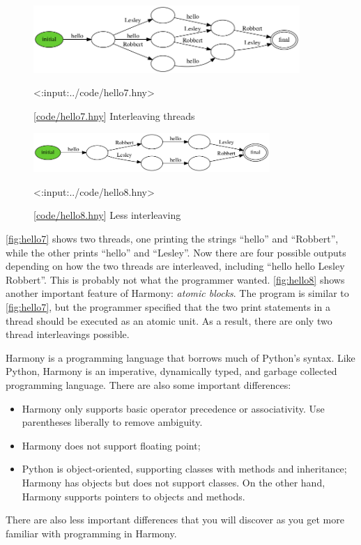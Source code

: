 \documentclass{report}
\newcommand{\harmonylink}[1]{%
[\href{https://harmony.cs.cornell.edu/#1}{\underline{#1}}]%
}
\newenvironment{code}{
\tcolorbox
}{
\endtcolorbox
}
\begin{document}
\begin{figure}
\begin{center}
\includegraphics[width=0.9\textwidth]{figures/hello7.png}
\end{center}
\begin{code}
<{:input:../code/hello7.hny}>
\end{code}
\caption{\harmonylink{code/hello7.hny} Interleaving threads}
\label{fig:hello7}
\end{figure}

\begin{figure}
\begin{center}
\includegraphics[width=0.8\textwidth]{figures/hello8.png}
\end{center}
\begin{code}
<{:input:../code/hello8.hny}>
\end{code}
\caption{\harmonylink{code/hello8.hny} Less interleaving}
\label{fig:hello8}
\end{figure}

\autoref{fig:hello7} shows two threads, one printing the strings
``hello'' and ``Robbert'', while the other prints ``hello'' and
``Lesley''.  Now there are four possible outputs depending on
how the two threads are interleaved, including
``hello hello Lesley Robbert''.  This is probably not what
the programmer wanted.  \autoref{fig:hello8} shows another
important feature of Harmony: \emph{atomic blocks}.  The
program is similar to \autoref{fig:hello7}, but the programmer
specified that the two print statements in a thread should
be executed as an atomic unit.  As a result, there are only
two thread interleavings possible.

Harmony is a programming language that borrows much of
Python's syntax.
Like Python, Harmony is an imperative,
dynamically typed, and garbage collected programming language.
There are also some important differences:
\begin{itemize}
\item Harmony only supports basic operator precedence or associativity.
Use parentheses liberally to remove ambiguity.
\item Harmony does not support floating point;
\item Python is object-oriented, supporting classes with methods and
inheritance; Harmony has objects but does not support classes.
On the other hand, Harmony supports pointers to objects and methods.
\end{itemize}
There are also less important differences that you will discover as
you get more familiar with programming in Harmony.
\end{document}

